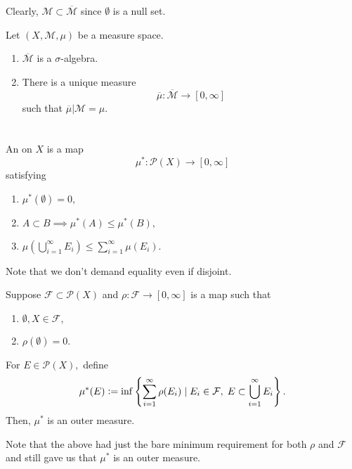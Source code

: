 \documentclass[12pt]{article}	%
\begin{document}
Clearly, $\mathcal{M} \subset \overline{\mathcal{M}}$ since $\emptyset$ is a null set.

\begin{prop}
	Let $(X, \mathcal{M}, \mu)$ be a measure space.
	\begin{enumerate}
		\item $\overline{\mathcal{M}}$ is a $\sigma$-algebra.
		\item There is a unique measure
		\begin{equation*} 
			\overline{\mu} : \overline{\mathcal{M}} \to [0, \infty]
		\end{equation*}
		such that $\overline{\mu}|\mathcal{M} = \mu.$
	\end{enumerate}
\end{prop}

\section{} %

\begin{defn}
	An  on $X$ is a map
	\begin{equation*} 
		\mu^* : \mathcal{P}(X) \to [0, \infty]
	\end{equation*}
	satisfying
	\begin{enumerate}
		\item $\mu^*(\emptyset) = 0,$
		\item $A \subset B \implies \mu^*(A) \le \mu^*(B),$
		\item $\mu\left(\bigcup_{i = 1}^\infty E_i\right) \le \sum_{i = 1}^{\infty} \mu(E_i).$
	\end{enumerate}
\end{defn}
Note that we don't demand equality even if disjoint.

\begin{prop} \label{prop:constructoutermeasure}
	Suppose $\mathcal{F} \subset \mathcal{P}(X)$ and $\rho : \mathcal{F} \to [0, \infty]$ is a map such that
	\begin{enumerate}
		\item $\emptyset, X \in \mathcal{F},$
		\item $\rho(\emptyset) = 0.$
	\end{enumerate}
	For $E \in \mathcal{P}(X),$ define
	\begin{equation*} 
		\mu^*(E) \vcentcolon= \inf\left\{\sum_{i = 1}^{\infty}\rho(E_i) \mid E_i \in \mathcal{F},\; E \subset \bigcup_{i = 1}^\infty E_i\right\}.
	\end{equation*}
	Then, $\mu^*$ is an outer measure.
\end{prop}
Note that the above had just the bare minimum requirement for both $\rho$ and $\mathcal{F}$ and still gave us that $\mu^*$ is an outer measure.
\end{document}
